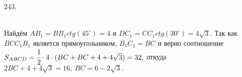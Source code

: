 243. \begin{figure}[ht!]
\end{figure}\\
Найдём $AB_1=BB_1 ctg(45^\circ)=4$ и $DC_1=CC_1 ctg(30^\circ)=4\sqrt{3}.$ Так как $BCC_1B_1$ является прямоугольником, $B_1C_1=BC$ и верно соотношение
$S_{ABCD}=\cfrac{1}{2}\cdot4\cdot(BC+BC+4+4\sqrt{3})=32,$ откуда $2BC+4+4\sqrt{3}=16,\ BC=6-2\sqrt{3}.$\\
